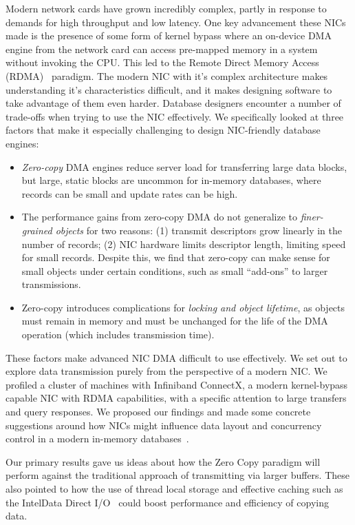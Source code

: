 Modern network cards have grown incredibly complex, partly in response to
demands for high throughput and low latency. One key advancement these NICs made 
is the presence of some form of kernel bypass where an on-device DMA engine from the network card 
can access pre-mapped memory in a system without invoking the CPU. This led to the Remote 
Direct Memory Access (RDMA)~\cite{rdmapatent} paradigm. The modern NIC with it's complex architecture
makes understanding it's characteristics difficult, and it makes designing software to take advantage
of them even harder. Database designers encounter a number of trade-offs when trying to use the NIC effectively.
We specifically looked at three factors that make it especially challenging to design NIC-friendly
database engines:
\begin{itemize}
  \item {\em Zero-copy} DMA engines reduce server load for transferring large data
    blocks, but large, static blocks are uncommon for in-memory databases,
    where records can be small and update rates can be high.
  \item The performance gains from zero-copy DMA do not generalize to
      {\em finer-grained objects} for two reasons: (1) transmit
      descriptors grow linearly in the number of records;
      (2) NIC hardware limits descriptor
      length, limiting speed for small records.
      Despite this, we find that zero-copy
      can make sense for small objects under certain conditions, such as
      small ``add-ons'' to larger transmissions.
   \item Zero-copy introduces complications for \emph{locking and object
      lifetime}, as objects must remain in memory and must be
      unchanged for the life of the DMA operation (which includes transmission
      time).
\end{itemize}


These factors make advanced NIC DMA difficult to use effectively. We set out to explore data 
transmission purely from the perspective of a modern NIC. We profiled a cluster of machines with
Infiniband ConnectX, a modern kernel-bypass capable NIC
with RDMA capabilities, with a specific attention to large transfers and query responses.
We proposed our findings and made some concrete suggestions around how NICs might
influence data layout and concurrency control in a modern in-memory 
databases~\cite{KesavanRicciStutsman:IMDM16}. 

Our primary results gave us ideas about how the Zero Copy paradigm will perform against
the traditional approach of transmitting via larger buffers. These also pointed 
to how the use of thread local storage and effective caching such as the 
Intel\textregistered Data Direct I/O~\cite{ddio} could boost performance and 
efficiency of copying data. 

